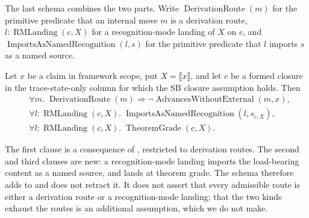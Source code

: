 The last schema combines the two parts.  Write
\(\operatorname{DerivationRoute}(m)\) for the primitive predicate that
an internal move \(m\) is a derivation route,
\(l:\operatorname{RMLanding}(c,X)\) for a recognition-mode landing of
\(X\) on \(c\), and \(\operatorname{ImportsAsNamedRecognition}(l,s)\)
for the primitive predicate that \(l\) imports \(s\) as a named source.

\begin{schema}\label{thm:attack-foreclosure-v5}
Let \(x\) be a claim in framework scope, put \(X=\llbracket x\rrbracket\),
and let \(c\) be a formed closure in the trace-state-only column for which
the SB closure assumption holds.  Then
\[
\begin{aligned}
  &\forall m.\;
    \operatorname{DerivationRoute}(m)
    \Longrightarrow
        \neg\operatorname{AdvancesWithoutExternal}(m,x),\\
  &\forall l:\operatorname{RMLanding}(c,X).\;
    \operatorname{ImportsAsNamedRecognition}(l,s_{c,X}),\\
  &\forall l:\operatorname{RMLanding}(c,X).\;
    \operatorname{TheoremGrade}(c,X).
\end{aligned}
\]
\end{schema}

The first clause is a consequence of ,
restricted to derivation routes.  The second and third clauses are new:
a recognition-mode landing imports the load-bearing content as a named
source, and lands at theorem grade.  The schema therefore adds to
 and does not retract it.  It does not
assert that every admissible route is either a derivation route or a
recognition-mode landing; that the two kinds exhaust the routes is an
additional assumption, which we do not make.


